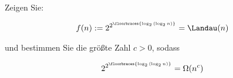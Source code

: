 
\begin{exercise}

Zeigen Sie:

\begin{align*}
  f(n) := 2^{2^{\floorbraces{\log_2{(\log_2{n})}}}} = \Landau(n)
\end{align*}

und bestimmen Sie die größte Zahl $c > 0$, sodass

\begin{align*}
  2^{2^{\floorbraces{\log_2{(\log_2{n})}}}} = \Omega(n^c)
\end{align*}

\end{exercise}


